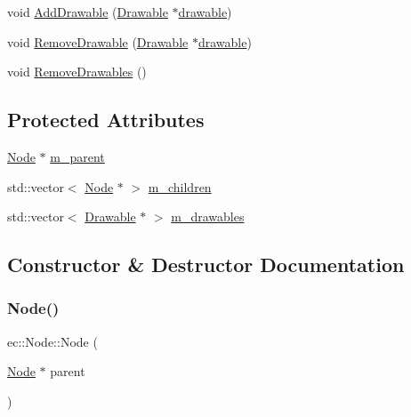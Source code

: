 \begin{DoxyCompactItemize}
\item 
void \mbox{\hyperlink{classec_1_1_node_aee80ae03faf344743ab38944ce3ced5f}{Add\+Drawable}} (\mbox{\hyperlink{classec_1_1_drawable}{Drawable}} $\ast$\mbox{\hyperlink{namespaceec_ae4420ccd0f79418a5ce075e43909289fac571a3227368b17e0ecc38a2a417e201}{drawable}})
\item 
void \mbox{\hyperlink{classec_1_1_node_acd641d3927ae368628ac90d5d79597d9}{Remove\+Drawable}} (\mbox{\hyperlink{classec_1_1_drawable}{Drawable}} $\ast$\mbox{\hyperlink{namespaceec_ae4420ccd0f79418a5ce075e43909289fac571a3227368b17e0ecc38a2a417e201}{drawable}})
\item 
void \mbox{\hyperlink{classec_1_1_node_ad874f229d3602ac6f0d0f0ce502a1fbc}{Remove\+Drawables}} ()
\end{DoxyCompactItemize}
\subsection*{Protected Attributes}
\begin{DoxyCompactItemize}
\item 
\mbox{\hyperlink{classec_1_1_node}{Node}} $\ast$ \mbox{\hyperlink{classec_1_1_node_a9f5373bd3ba5bfed53894223adcfe791}{m\+\_\+parent}}
\item 
std\+::vector$<$ \mbox{\hyperlink{classec_1_1_node}{Node}} $\ast$ $>$ \mbox{\hyperlink{classec_1_1_node_a648e1758013c7fc5899cbff2f8fe41fa}{m\+\_\+children}}
\item 
std\+::vector$<$ \mbox{\hyperlink{classec_1_1_drawable}{Drawable}} $\ast$ $>$ \mbox{\hyperlink{classec_1_1_node_aa9f624971a4906674148117ba4442c01}{m\+\_\+drawables}}
\end{DoxyCompactItemize}


\subsection{Constructor \& Destructor Documentation}
\mbox{\label{classec_1_1_node_a99fb4715fbc3f193ad5ed88dff15cd0e}} 
\subsubsection{\texorpdfstring{Node()}{Node()}}
{\footnotesize\ttfamily ec\+::\+Node\+::\+Node (\begin{DoxyParamCaption}\item[{\mbox{\hyperlink{classec_1_1_node}{Node}} $\ast$}]{parent }\end{DoxyParamCaption})\hspace{0.3cm}{\ttfamily [explicit]}}


